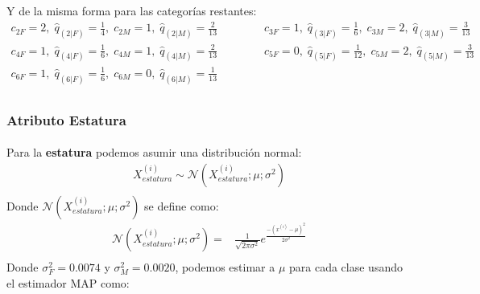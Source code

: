 \documentclass[12pt]{article}
\begin{document}
 Y de la misma forma para las categorías restantes:
 \begin{equation}
 \begin{split}
 c_{2F} = 2, \; \hat{q}_{(2|F)} = \frac{1}{4}, \; c_{2M} = 1, \; \hat{q}_{(2|M)} = \frac{2}{13} \; \; \; \; \; \; \; \; \; \; \; \; &  c_{3F} = 1, \; \hat{q}_{(3|F)} = \frac{1}{6}, \; c_{3M} = 2, \; \hat{q}_{(3|M)} = \frac{3}{13}\\
 c_{4F} = 1, \; \hat{q}_{(4|F)} = \frac{1}{6}, \; c_{4M} = 1, \; \hat{q}_{(4|M)} = \frac{2}{13} \; \; \; \; \; \; \; \; \; \; \; \; &  c_{5F} = 0, \; \hat{q}_{(5|F)} = \frac{1}{12}, \; c_{5M} = 2, \; \hat{q}_{(5|M)} = \frac{3}{13}\\ 
 c_{6F} = 1, \; \hat{q}_{(6|F)} = \frac{1}{6}, \;c_{6M} = 0, \; \hat{q}_{(6|M)} = \frac{1}{13}\\
 \end{split}
 \end{equation}
 \subsubsection{Atributo Estatura}
 \paragraph{}Para la \textbf{estatura} podemos asumir una distribución normal:
 \begin{equation}
 \begin{split}
 X_{estatura}^{(i)}\sim \mathcal{N}(X_{estatura}^{(i)};\mu;\sigma^2)\\
 \end{split}
 \end{equation}
 Donde $\mathcal{N}(X_{estatura}^{(i)};\mu;\sigma^2)$ se define como:\\
 \begin{equation}
 \begin{split}
 \mathcal{N}(X_{estatura}^{(i)};\mu;\sigma^2) =& \frac{1}{\sqrt{2\pi\sigma^2}}e^{\frac{-(x^{(i)} - \mu)^2}{2\sigma^2}}\\
 \end{split}
 \end{equation}
 Donde $\sigma_F^2 = 0.0074$ y $\sigma_M^2 = 0.0020$, podemos estimar a $\mu$ para cada clase usando el estimador MAP como:
\end{document}
